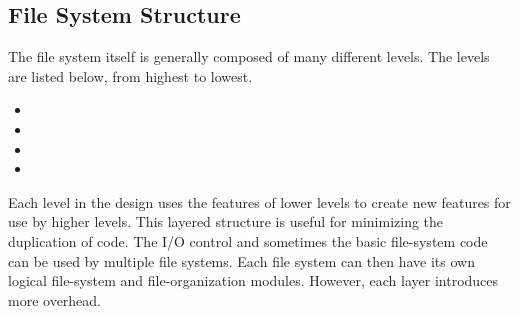 \subsection{File System Structure}\label{subsec:File_System_Structure}
The file system itself is generally composed of many different levels.
The levels are listed below, from highest to lowest.
\begin{itemize}[noitemsep]
\item {}
\item {}
\item {}
\item {}
\end{itemize}

Each level in the design uses the features of lower levels to create new features for use by higher levels.
This layered structure is useful for minimizing the duplication of code.
The I/O control and sometimes the basic file-system code can be used by multiple file systems.
Each file system can then have its own logical file-system and file-organization modules.
However, each layer introduces more overhead.


